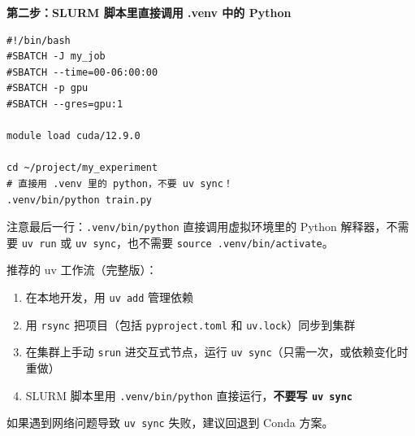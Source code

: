 \textbf{第二步：SLURM 脚本里直接调用 .venv 中的 Python}

\begin{lstlisting}[language=slurm]
#!/bin/bash
#SBATCH -J my_job
#SBATCH --time=00-06:00:00
#SBATCH -p gpu
#SBATCH --gres=gpu:1

module load cuda/12.9.0

cd ~/project/my_experiment
# 直接用 .venv 里的 python，不要 uv sync！
.venv/bin/python train.py
\end{lstlisting}

注意最后一行：\texttt{.venv/bin/python} 直接调用虚拟环境里的 Python 解释器，不需要 \texttt{uv run} 或 \texttt{uv sync}，也不需要 \texttt{source .venv/bin/activate}。


\begin{tipbox}
推荐的 uv 工作流（完整版）：
\begin{enumerate}[nosep]
  \item 在本地开发，用 \texttt{uv add} 管理依赖
  \item 用 \texttt{rsync} 把项目（包括 \texttt{pyproject.toml} 和 \texttt{uv.lock}）同步到集群
  \item 在集群上手动 \texttt{srun} 进交互式节点，运行 \texttt{uv sync}（只需一次，或依赖变化时重做）
  \item SLURM 脚本里用 \texttt{.venv/bin/python} 直接运行，\textbf{不要写 \texttt{uv sync}}
\end{enumerate}
如果遇到网络问题导致 \texttt{uv sync} 失败，建议回退到 Conda 方案。
\end{tipbox}
